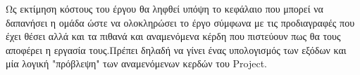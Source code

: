 \documentclass{../ol-softwaremanual}
\begin{document}
\vspace{20pt}


\vspace{20pt}

\flushleft
Ως εκτίμηση κόστους του έργου θα ληφθεί υπόψη το κεφάλαιο που μπορεί να δαπανήσει η ομάδα ώστε να ολοκληρώσει το έργο σύμφωνα με τις προδιαγραφές που έχει θέσει αλλά και τα πιθανά και αναμενόμενα κέρδη που πιστεύουν πως θα τους αποφέρει η εργασία τους.Πρέπει δηλαδή να γίνει ένας υπολογισμός των εξόδων και μία λογική "πρόβλεψη" των αναμενόμενων κερδών του \en Project.\gr
\end{document}
